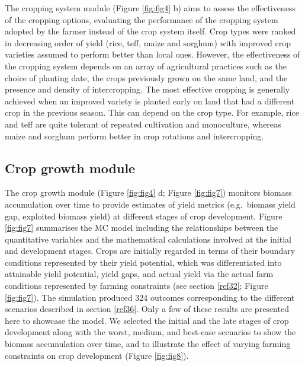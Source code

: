 \documentclass[]{elsarticle} %
\begin{document}
The cropping system module (Figure \ref{fig:fig4} b) aims to assess the effectiveness of the cropping options, evaluating the performance of the cropping system adopted by the farmer instead of the crop system itself. Crop types were ranked in decreasing order of yield (rice, teff, maize and sorghum) with improved crop varieties assumed to perform better than local ones. However, the effectiveness of the cropping system depends on an array of agricultural practices such as the choice of planting date, the crops previously grown on the same land, and the presence and density of intercropping. The most effective cropping is generally achieved when an improved variety is planted early on land that had a different crop in the previous season. This can depend on the crop type. For example, rice and teff are quite tolerant of repeated cultivation and monoculture, whereas maize and sorghum perform better in crop rotations and intercropping.

\hypertarget{ref44}{%
\subsection{Crop growth module}\label{ref44}}

The crop growth module (Figure \ref{fig:fig4} d; Figure \ref{fig:fig7}) monitors biomass accumulation over time to provide estimates of yield metrics (e.g.~biomass yield gap, exploited biomass yield) at different stages of crop development. Figure \ref{fig:fig7} summarises the MC model including the relationships between the quantitative variables and the mathematical calculations involved at the initial and development stages. Crops are initially regarded in terms of their boundary conditions represented by their yield potential, which was differentiated into attainable yield potential, yield gaps, and actual yield via the actual farm conditions represented by farming constraints (see section \ref{ref32}; Figure \ref{fig:fig7}). The simulation produced 324 outcomes corresponding to the different scenarios described in section \ref{ref36}. Only a few of these results are presented here to showcase the model. We selected the initial and the late stages of crop development along with the worst, medium, and best-case scenarios to show the biomass accumulation over time, and to illustrate the effect of varying farming constraints on crop development (Figure \ref{fig:fig8}).
\end{document}
